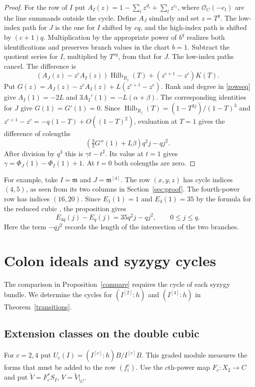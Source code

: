 \documentclass[11pt,a4paper,reqno]{amsart}
\numberwithin{equation}{section}
\theoremstyle{plain}
\newcommand{\OO}{\mathcal O}
\newcommand{\m}{\mathfrak m}
\DeclareMathOperator{\Hilb}{Hilb}
\begin{document}
\begin{proof}
For the row of $I$ put $A_I(z)=1-\sum_i z^{d_i}+\sum_l z^{e_l}$, where $\OO_C(-e_l)$ are the line summands outside the cycle. Define $A_J$ similarly and set $z=T^q$. The low-index path for $J$ is the one for $I$ shifted by $cq$, and the high-index path is shifted by $(c+1)q$. Multiplication by the appropriate power of $b^q$ realizes both identifications and preserves branch values in the chart $b=1$. Subtract the quotient series for $I$, multiplied by $T^{cq}$, from that for $J$. The low-index paths cancel. The difference is
\[
 (A_J(z)-z^cA_I(z))\Hilb_{R_j}(T)+(z^{c+1}-z^c)K(T).
\]
Put $G(z)=A_J(z)-z^cA_I(z)+L(z^{c+1}-z^c)$. Rank and degree in \eqref{rowseq} give $A_I(1)=-2L$ and $3A_I'(1)=-L(\alpha+\beta)$. The corresponding identities for $J$ give $G(1)=G'(1)=0$. Since $\Hilb_{R_j}(T)=(1-T^{3j})/(1-T)^3$ and $z^{c+1}-z^c=-q(1-T)+O((1-T)^2)$, evaluation at $T=1$ gives the difference of colengths
\[
 \left(\tfrac32G''(1)+L\beta\right)q^2j-qj^2.
\]
After division by $q^3$ this is $\gamma t-t^2$. Its value at $t=1$ gives $\gamma=\Phi_J(1)-\Phi_I(1)+1$. At $t=0$ both colengths are zero.
\end{proof}

For example, take $I=\m$ and $J=\m^{[4]}$. The row $(x,y,z)$ has cycle indices $(4,5)$, as seen from its two columns in Section~\ref{sec:proof}. The fourth-power row has indices $(16,20)$. Since $E_1(1)=1$ and $E_4(1)=35$ by the formula for the reduced cubic \cite[Theorem~3]{BC}, the proposition gives
\begin{equation}\label{eq:four-example}
 E_{4q}(j)-E_q(j)=35q^2j-qj^2,\qquad 0\le j\le q .
\end{equation}
Here the term $-qj^2$ records the length of the intersection of the two branches.

\section{Colon ideals and syzygy cycles}\label{sec:colon}

The comparison in Proposition~\ref{compare} requires the cycle of each syzygy bundle. We determine the cycles for $(I^{[2]}:h)$ and $(I^{[4]}:h)$ in Theorem~\ref{transitions}.

\subsection{Extension classes on the double cubic}

For $c=2,4$ put $U_c(I)=(I^{[c]}:h)B/I^{[c]}B$. This graded module measures the forms that must be added to the row $(f_i^c)$. Use the $c$th-power map $F_c:X_2\to C$ and put $\widetilde V=F_c^*S_I$, $V=\widetilde V|_C$.
\end{document}
